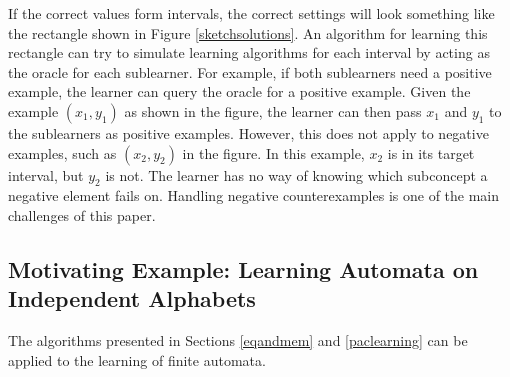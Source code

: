 

If the correct values form intervals, the correct settings will look something like the rectangle shown in Figure \ref{sketchsolutions}.
An algorithm for learning this rectangle can try to simulate learning algorithms for each interval by acting as the oracle for each sublearner. 
For example, if both sublearners need a positive example, the learner can query the oracle for a positive example. 
Given the example $(x_1,y_1)$ as shown in the figure, the learner can then pass $x_1$ and $y_1$ to the sublearners as positive examples. 
However, this does not apply to negative examples, such as $(x_2, y_2)$ in the figure. 
In this example, $x_2$ is in its target interval, but $y_2$ is not. 
The learner has no way of knowing which subconcept a negative element fails on.
Handling negative counterexamples is one of the main challenges of this paper.


\subsection{Motivating Example: Learning Automata on Independent Alphabets}

The algorithms presented in Sections \ref{eqandmem} and \ref{paclearning} can be applied to the learning of finite automata.




